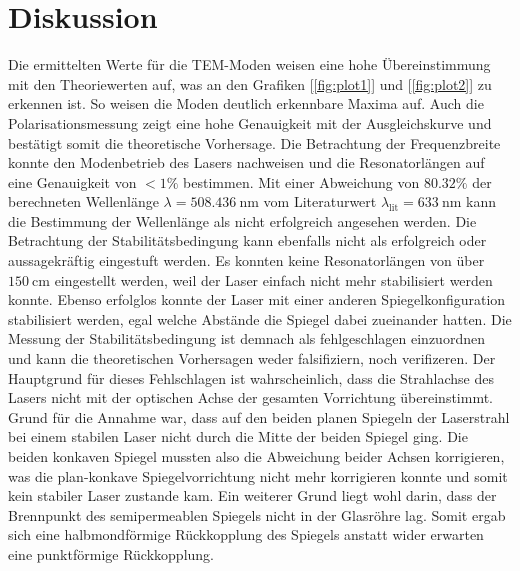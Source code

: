 \section{Diskussion}
\label{sec:Diskussion}
Die ermittelten Werte für die TEM-Moden weisen eine hohe Übereinstimmung mit den Theoriewerten auf, was an den Grafiken [\ref{fig:plot1}] und [\ref{fig:plot2}] zu erkennen ist.
So weisen die Moden deutlich erkennbare Maxima auf.
Auch die Polarisationsmessung zeigt eine hohe Genauigkeit mit der Ausgleichskurve und bestätigt somit die theoretische Vorhersage.
Die Betrachtung der Frequenzbreite konnte den Modenbetrieb des Lasers nachweisen und die Resonatorlängen auf eine Genauigkeit von $<1\%$ bestimmen. \newline
Mit einer Abweichung von $80.32\%$ der berechneten Wellenlänge $\lambda = \SI{508.436}{\nano\meter}$ vom Literaturwert $\lambda_\text{lit}=\SI{633}{\nano\meter}$ kann die Bestimmung der Wellenlänge
als nicht erfolgreich angesehen werden.
Die Betrachtung der Stabilitätsbedingung kann ebenfalls nicht als erfolgreich oder aussagekräftig eingestuft werden. Es konnten keine Resonatorlängen von über $\SI{150}{\centi\meter}$ eingestellt
werden, weil der Laser einfach nicht mehr stabilisiert werden konnte. Ebenso erfolglos konnte der Laser mit einer anderen Spiegelkonfiguration stabilisiert werden, egal welche Abstände die 
Spiegel dabei zueinander hatten. Die Messung der Stabilitätsbedingung ist demnach als fehlgeschlagen einzuordnen und kann die theoretischen Vorhersagen weder falsifiziern, noch verifizeren. \newline
Der Hauptgrund für dieses Fehlschlagen ist wahrscheinlich, dass die Strahlachse des Lasers nicht mit der optischen Achse der gesamten Vorrichtung übereinstimmt. Grund für die Annahme war,
dass auf den beiden planen Spiegeln der Laserstrahl bei einem stabilen Laser nicht durch die Mitte der beiden Spiegel ging. Die beiden konkaven Spiegel mussten also die Abweichung beider 
Achsen korrigieren, was die plan-konkave Spiegelvorrichtung nicht mehr korrigieren konnte und somit kein stabiler Laser zustande kam.
Ein weiterer Grund liegt wohl darin, dass der Brennpunkt des semipermeablen Spiegels nicht in der Glasröhre lag. Somit ergab sich eine halbmondförmige Rückkopplung des Spiegels anstatt wider erwarten
eine punktförmige Rückkopplung.
